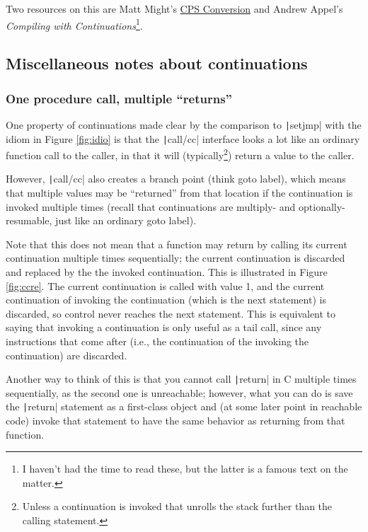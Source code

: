 \documentclass[]{article}
\begin{document}
Two resources on this are Matt Might's \href{https://matt.might.net/articles/cps-conversion/}{CPS Conversion} and Andrew Appel's \textit{Compiling with Continuations}\footnote{I haven't had the time to read these, but the latter is a famous text on the matter.}.

\subsection{Miscellaneous notes about continuations}
\label{sec:misc}

\subsubsection{One procedure call, multiple ``returns''}
\label{sec:mult}

One property of continuations made clear by the comparison to \texttt|setjmp| with the idiom in Figure \ref{fig:idio} is that the \texttt|call/cc| interface looks a lot like an ordinary function call to the caller, in that it will (typically\footnote{Unless a continuation is invoked that unrolls the stack further than the calling statement.}) return a value to the caller.

However, \texttt|call/cc| also creates a branch point (think goto label), which means that multiple values may be ``returned'' from that location if the continuation is invoked multiple times (recall that continuations are multiply- and optionally-resumable, just like an ordinary goto label).

Note that this does not mean that a function may return by calling its current continuation multiple times sequentially; the current continuation is discarded and replaced by the the invoked continuation. This is illustrated in Figure \ref{fig:ccre}. The current continuation is called with value 1, and the current continuation of invoking the continuation (which is the next statement) is discarded, so control never reaches the next statement. This is equivalent to saying that invoking a continuation is only useful as a tail call, since any instructions that come after (i.e., the continuation of the invoking the continuation) are discarded.

Another way to think of this is that you cannot call \texttt|return| in C multiple times sequentially, as the second one is unreachable; however, what you can do is save the \texttt|return| statement as a first-class object and (at some later point in reachable code) invoke that statement to have the same behavior as returning from that function.
\end{document}
